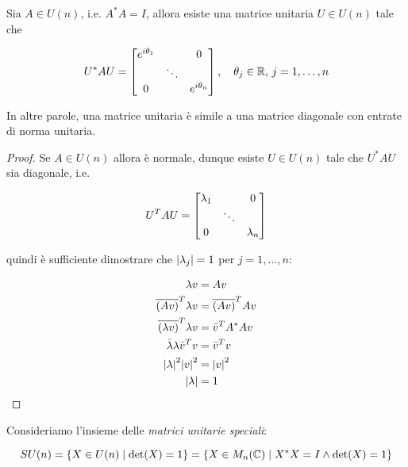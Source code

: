 \begin{corollary}[3]\label{cor:unit-matrix-similar}
	Sia $ A \in U(n) $, i.e. $ A^{*} A = I $, allora esiste una matrice unitaria $ U \in U(n) $ tale che
	
	\begin{equation}
		U^{*} A U = %
		\bmqty{ %
				\dmat{ %
						e^{i \theta_{1}} & & 0 \\
						& \ddots & \\
						0 & & e^{i \theta_{n}} %
						}
				} %
		\qcomma \theta_{j} \in \R, \, j=1,\dots,n
	\end{equation}

	In altre parole, una matrice unitaria è simile a una matrice diagonale con entrate di norma unitaria.
\end{corollary}

\begin{proof}
	Se $ A \in U(n) $ allora è normale, dunque esiste $ U \in U(n) $ tale che $ U^{*} A U $ sia diagonale, i.e.
	
	\begin{equation}
		U^{T} A U = %
		\bmqty{ %
				\dmat{ %
						\lambda_{1} & & 0 \\
						& \ddots & \\
						0 & & \lambda_{n} %
						}
				}
	\end{equation}

	quindi è sufficiente dimostrare che $ \abs{\lambda_{j}} = 1 $ per $ j=1,\dots,n $:
	
	\begin{align}
		\begin{split}
			\lambda v &= A v \\
			\overline{(A v)}^{T} \lambda v &= \overline{(A v)}^{T} A v \\
			\overline{(\lambda v)}^{T} \lambda v &= \bar{v}^{T} A^{*} A v \\
			\bar{\lambda} \lambda \bar{v}^{T} v &= \bar{v}^{T} v \\
			\abs{\lambda}^{2} \abs{v}^{2} &= \abs{v}^{2} \\
			\abs{\lambda} &= 1
		\end{split}
	\end{align}
\end{proof}

Consideriamo l'insieme delle \textit{matrici unitarie speciali}:

\begin{equation}
	SU(n) = \{ X \in U(n) \mid \det(X) = 1 \} %
	= \{ X \in M_{n}(\C) \mid X^{*} X = I \wedge \det(X) = 1 \}
\end{equation}

